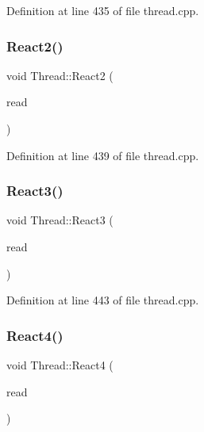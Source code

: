Definition at line 435 of file thread.\+cpp.

\mbox{\label{class_thread_a2f6f8970c77f9dd30ab9d15271980f98}} 
\subsubsection{\texorpdfstring{React2()}{React2()}}
{\footnotesize\ttfamily void Thread\+::\+React2 (\begin{DoxyParamCaption}\item[{Q\+String\+List}]{read }\end{DoxyParamCaption})\hspace{0.3cm}{\ttfamily [private]}}



Definition at line 439 of file thread.\+cpp.

\mbox{\label{class_thread_ae2837ccfe468e07e4be85bcffea20cb7}} 
\subsubsection{\texorpdfstring{React3()}{React3()}}
{\footnotesize\ttfamily void Thread\+::\+React3 (\begin{DoxyParamCaption}\item[{Q\+String\+List}]{read }\end{DoxyParamCaption})\hspace{0.3cm}{\ttfamily [private]}}



Definition at line 443 of file thread.\+cpp.

\mbox{\label{class_thread_a6fca79a0d729f44cef7e84ef8ef3c527}} 
\subsubsection{\texorpdfstring{React4()}{React4()}}
{\footnotesize\ttfamily void Thread\+::\+React4 (\begin{DoxyParamCaption}\item[{Q\+String\+List}]{read }\end{DoxyParamCaption})\hspace{0.3cm}{\ttfamily [private]}}



